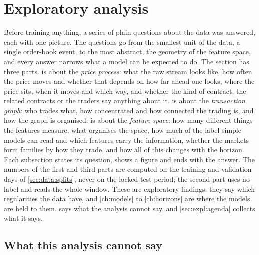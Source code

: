\section{Exploratory analysis}
\label{ch:exploration}

Before training anything, a series of plain questions about the data was answered, each
with one picture.  The questions go from the smallest unit of the data, a single
order-book event, to the most abstract, the geometry of the feature space, and every
answer narrows what a model can be expected to do.  The section has three parts.
 is about the \emph{price process}: what the raw stream looks like,
how often the price moves and whether that depends on how far ahead one looks, where the
price sits, when it moves and which way, and whether the kind of contract, the related
contracts or the traders say anything about it.   is about the
\emph{transaction graph}: who trades what, how concentrated and how connected the trading
is, and how the graph is organised.   is about the \emph{feature
space}: how many different things the features measure, what organises the space, how
much of the label simple models can read and which features carry the information,
whether the markets form families by how they trade, and how all of this changes with the
horizon.  Each subsection states its question, shows a figure and ends with the answer.
The numbers of the first and third parts are computed on the training and validation days
of \cref{sec:data:splits}, never on the locked test period; the second part uses no label
and reads the whole window.  These are exploratory findings: they say which regularities
the data have, and \cref{ch:models} to \cref{ch:horizons} are where the models are held
to them.   says what the analysis cannot say, and
\cref{sec:expl:agenda} collects what it says.





\subsection{What this analysis cannot say}
\label{sec:expl:limits}

